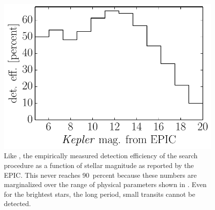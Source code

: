 \begin{figure}[p]
\begin{center}
\includegraphics{figures/ketu/completeness-mag.pdf}
\end{center}
\caption{%
Like , the empirically measured detection efficiency of the
search procedure as a function of stellar magnitude as reported by the EPIC.
This never reaches 90~percent because these numbers are marginalized over the
range of physical parameters shown in .
Even for the brightest stars, the long period, small transits cannot be
detected.
}
\end{figure}


